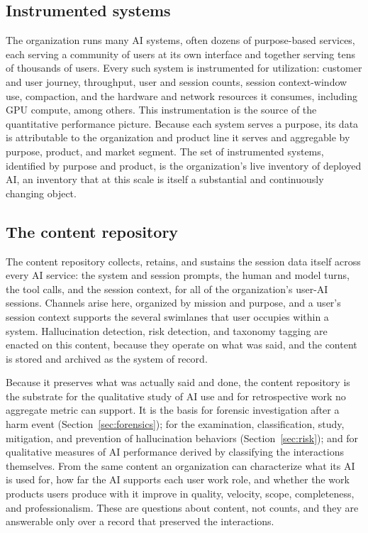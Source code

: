 \documentclass[11pt]{article}
\begin{document}
\subsection{Instrumented systems}

The organization runs many AI systems, often dozens of purpose-based services, each
serving a community of users at its own interface and together serving tens of
thousands of users. Every such system is instrumented for utilization: customer and
user journey, throughput, user and session counts, session context-window use,
compaction, and the hardware and network resources it consumes, including GPU
compute, among others. This instrumentation is the source of the quantitative
performance picture. Because each system serves a purpose, its data is attributable
to the organization and product line it serves and aggregable by purpose, product,
and market segment. The set of instrumented systems, identified by purpose and
product, is the organization's live inventory of deployed AI, an inventory that at
this scale is itself a substantial and continuously changing object.

\subsection{The content repository}

The content repository collects, retains, and sustains the session data itself
across every AI service: the system and session prompts, the human and model turns,
the tool calls, and the session context, for all of the organization's user-AI
sessions. Channels arise here, organized by mission and purpose, and a user's
session context supports the several swimlanes that user occupies within a system.
Hallucination detection, risk detection, and taxonomy tagging are enacted on this
content, because they operate on what was said, and the content is stored and
archived as the system of record.

Because it preserves what was actually said and done, the content repository is the
substrate for the qualitative study of AI use and for retrospective work no
aggregate metric can support. It is the basis for forensic investigation after a
harm event (Section~\ref{sec:forensics}); for the examination, classification,
study, mitigation, and prevention of hallucination behaviors
(Section~\ref{sec:risk}); and for qualitative measures of AI performance derived by
classifying the interactions themselves. From the same content an organization can
characterize what its AI is used for, how far the AI supports each user work role,
and whether the work products users produce with it improve in quality, velocity,
scope, completeness, and professionalism. These are questions about content, not
counts, and they are answerable only over a record that preserved the interactions.
\end{document}
